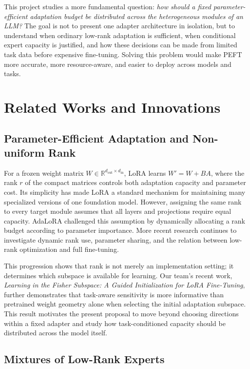 \documentclass{article}
\begin{document}
This project studies a more fundamental question: \emph{how should a fixed parameter-efficient adaptation budget be distributed across the heterogeneous modules of an LLM?} The goal is not to present one adapter architecture in isolation, but to understand when ordinary low-rank adaptation is sufficient, when conditional expert capacity is justified, and how these decisions can be made from limited task data before expensive fine-tuning. Solving this problem would make PEFT more accurate, more resource-aware, and easier to deploy across models and tasks.

\section{Related Works and Innovations}

\subsection{Parameter-Efficient Adaptation and Non-uniform Rank}

For a frozen weight matrix $W\in\mathbb{R}^{d_{\mathrm{out}}\times d_{\mathrm{in}}}$, LoRA learns $W'=W+BA$, where the rank $r$ of the compact matrices controls both adaptation capacity and parameter cost\cite{LORA}. Its simplicity has made LoRA a standard mechanism for maintaining many specialized versions of one foundation model. However, assigning the same rank to every target module assumes that all layers and projections require equal capacity. AdaLoRA challenged this assumption by dynamically allocating a rank budget according to parameter importance\cite{ADALORA}. More recent research continues to investigate dynamic rank use, parameter sharing, and the relation between low-rank optimization and full fine-tuning.

This progression shows that rank is not merely an implementation setting; it determines which subspace is available for learning. Our team's recent work, \emph{Learning in the Fisher Subspace: A Guided Initialization for LoRA Fine-Tuning}, further demonstrates that task-aware sensitivity is more informative than pretrained weight geometry alone when selecting the initial adaptation subspace\cite{FISHERSUBSPACE}. This result motivates the present proposal to move beyond choosing directions within a fixed adapter and study how task-conditioned capacity should be distributed across the model itself.

\subsection{Mixtures of Low-Rank Experts}
\end{document}
